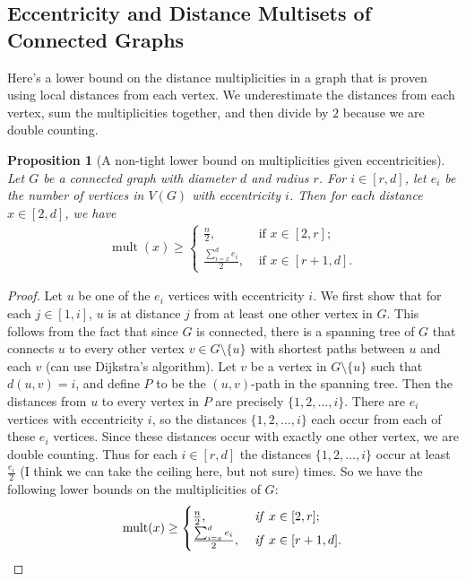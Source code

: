 \documentclass[12]{article}
\DeclareMathOperator{\mult}{mult}
\newtheorem{prop}[thm]{Proposition}
\theoremstyle{definition}
\begin{document}
	\subsection{Eccentricity and Distance Multisets of Connected Graphs}
	
	Here's a lower bound on the distance multiplicities in a graph that is proven using local distances from each vertex.  We underestimate the distances from each vertex, sum the multiplicities together, and then divide by $2$ because we are double counting.
	
	\begin{prop}[A non-tight lower bound on multiplicities given eccentricities]
		Let $G$ be a connected graph with diameter $d$ and radius $r$.  For $i \in [r,d]$, let $e_i$ be the number of vertices in $V(G)$ with eccentricity $i$.  Then for each distance $x \in [2,d]$, we have
		\begin{align*}
			\mult(x) \geq \begin{cases}
				\frac{n}{2}, &\text{ if } x \in [2,r];	\\
				\frac{\sum_{i=x}^d e_i}{2}, &\text{ if } x \in [r+1,d].
			\end{cases}
		\end{align*}
	\end{prop}
	
	\begin{proof}
		Let $u$ be one of the $e_i$ vertices with eccentricity $i$.  We first show that for each $j \in [1,i]$, $u$ is at distance $j$ from at least one other vertex in $G$.  This follows from the fact that since $G$ is connected, there is a spanning tree of $G$ that connects $u$ to every other vertex $v \in G \setminus \{u\}$ with shortest paths between $u$ and each $v$ (can use Dijkstra's algorithm). Let $v$ be a vertex in $G \setminus \{u\}$ such that $d(u,v) = i$, and define $P$ to be the $(u,v)$-path in the spanning tree.  Then the distances from $u$ to every vertex in $P$ are precisely $\{1, 2, \ldots, i\}$.  There are $e_i$ vertices with eccentricity $i$, so the distances $\{1, 2, \ldots, i\}$ each occur from each of these $e_i$ vertices.  Since these distances occur with exactly one other vertex, we are double counting.  Thus for each $i \in [r, d]$ the distances $\{1, 2, \ldots, i\}$ occur at least $\tfrac{e_i}{2}$ (I think we can take the ceiling here, but not sure) times.  So we have the following lower bounds on the multiplicities of $G$:
		\begin{align*}
			\mult(x) \geq \begin{cases}
				\frac{n}{2}, &\text{ \textit{if} } x \in [2,r];	\\
				\frac{\sum_{i=x}^d e_i}{2}, &\text{ \textit{if} } x \in [r+1,d].
			\end{cases}
		\end{align*} \qedhere
	\end{proof}
	
\end{document}
